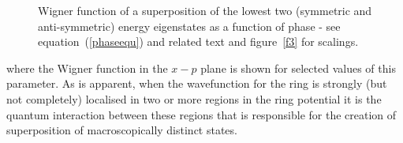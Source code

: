 \documentclass[twocolumn,a4paper,superscriptaddress,showpacs,floatfix,pra]{revtex4}
\begin{document}
\begin{figure}[!t]
\begin{center}
\end{center}
\caption{Wigner  function  of  a   superposition  of  the  lowest  two
(symmetric  and anti-symmetric)  energy eigenstates  as a  function of
phase  - see  equation~(\protect\ref{phaseequ}) and  related  text and
figure~\ref{f3} for scalings. }
\label{f4}
\end{figure}
where the  Wigner function  in the $x-p$  plane is shown  for selected
values of  this parameter. As  is apparent, when the  wavefunction for
the ring  is strongly  (but not completely)  localised in two  or more
regions in  the ring potential  it is the quantum  interaction between
these  regions  that  is  responsible  for  the  creation  of superposition of macroscopically distinct states.
\end{document}
